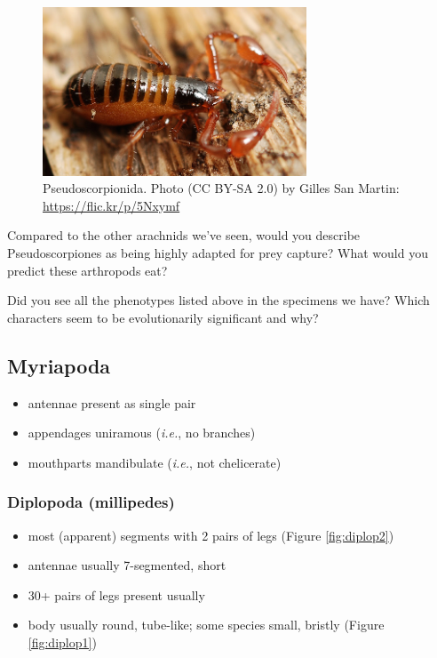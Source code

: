 \documentclass[letterpaper, 11pt]{article}
\begin{document}
\begin{figure}[ht!]
  \centering
    \includegraphics[width=0.7\textwidth]{pseudo}
  \caption{Pseudoscorpionida. Photo (CC BY-SA 2.0) by Gilles San Martin: \url{https://flic.kr/p/5Nxymf}}
  \label{fig:pseudo}
\end{figure}
\noindent{}Compared to the other arachnids we've seen, would you describe Pseudoscorpiones as being highly adapted for prey capture? What would you predict these arthropods eat?\vspace{2cm}

\noindent{}Did you see all the phenotypes listed above in the specimens we have? Which characters seem to be evolutionarily significant and why? \vspace{5cm}

\subsection{Myriapoda}
\begin{itemize}
\item antennae present as single pair
\item appendages uniramous (\textit{i.e.}, no branches)
\item mouthparts mandibulate (\textit{i.e.}, not chelicerate)
\end{itemize}

\subsubsection*{Diplopoda (millipedes)}
\begin{itemize}
\item most (apparent) segments with 2 pairs of legs (Figure \ref{fig:diplop2})
\item antennae usually 7-segmented, short
\item 30+ pairs of legs present usually
\item body usually round, tube-like; some species small, bristly (Figure \ref{fig:diplop1})
\end{itemize}
\end{document}
